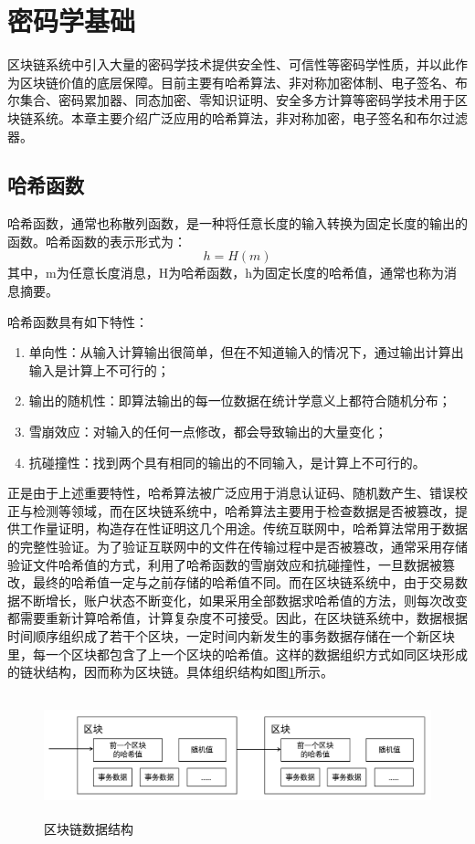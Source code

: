 \section{密码学基础}

区块链系统中引入大量的密码学技术提供安全性、可信性等密码学性质，并以此作为区块链价值的底层保障。目前主要有哈希算法、非对称加密体制、电子签名、布尔集合、密码累加器、同态加密、零知识证明、安全多方计算等密码学技术用于区块链系统。本章主要介绍广泛应用的哈希算法，非对称加密，电子签名和布尔过滤器。

\subsection{哈希函数}

哈希函数，通常也称散列函数，是一种将任意长度的输入转换为固定长度的输出的函数。哈希函数的表示形式为：
$$h=H(m)$$
其中，m为任意长度消息，H为哈希函数，h为固定长度的哈希值，通常也称为消息摘要。

哈希函数具有如下特性：
\begin{enumerate}
\item 单向性：从输入计算输出很简单，但在不知道输入的情况下，通过输出计算出输入是计算上不可行的；
\item 输出的随机性：即算法输出的每一位数据在统计学意义上都符合随机分布；
\item 雪崩效应：对输入的任何一点修改，都会导致输出的大量变化；
\item 抗碰撞性：找到两个具有相同的输出的不同输入，是计算上不可行的。
\end{enumerate}

正是由于上述重要特性，哈希算法被广泛应用于消息认证码、随机数产生、错误校正与检测等领域，而在区块链系统中，哈希算法主要用于检查数据是否被篡改，提供工作量证明，构造存在性证明这几个用途。传统互联网中，哈希算法常用于数据的完整性验证。为了验证互联网中的文件在传输过程中是否被篡改，通常采用存储验证文件哈希值的方式，利用了哈希函数的雪崩效应和抗碰撞性，一旦数据被篡改，最终的哈希值一定与之前存储的哈希值不同。而在区块链系统中，由于交易数据不断增长，账户状态不断变化，如果采用全部数据求哈希值的方法，则每次改变都需要重新计算哈希值，计算复杂度不可接受。因此，在区块链系统中，数据根据时间顺序组织成了若干个区块，一定时间内新发生的事务数据存储在一个新区块里，每一个区块都包含了上一个区块的哈希值。这样的数据组织方式如同区块形成的链状结构，因而称为区块链。具体组织结构如图\ref{fig:hashchain}所示。


\begin{figure}
\centering	
\includegraphics [width=400pt,height=100pt]{figures/hashchain.png}
\caption{区块链数据结构}
\label{fig:hashchain}
\end{figure}

